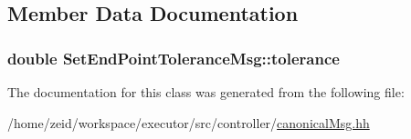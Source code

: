 \subsection{Member Data Documentation}
\hypertarget{class_set_end_point_tolerance_msg_ae9f1ed5d2407afeea31a428eba055db8}{
\subsubsection[{tolerance}]{\setlength{\rightskip}{0pt plus 5cm}double {\bf SetEndPointToleranceMsg::tolerance}}}
\label{class_set_end_point_tolerance_msg_ae9f1ed5d2407afeea31a428eba055db8}


The documentation for this class was generated from the following file:\begin{DoxyCompactItemize}
\item 
/home/zeid/workspace/executor/src/controller/\hyperlink{canonical_msg_8hh}{canonicalMsg.hh}\end{DoxyCompactItemize}

